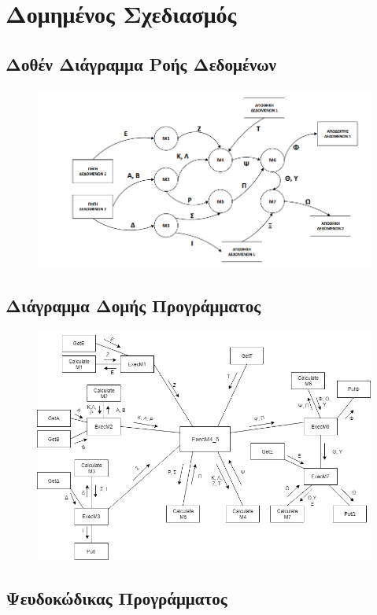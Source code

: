 \documentclass{article}
\begin{document}
\newpage
\section{Δομημένος Σχεδιασμός}
\subsection*{Δοθέν Διάγραμμα Ροής Δεδομένων}
\begin{figure}[!h]
	\includegraphics[width=\linewidth]{../Structured_Design/drd.png}
\end{figure}

\subsection{Διάγραμμα Δομής Προγράμματος}
\begin{figure}[!h]
	\includegraphics[width=14cm]{../Structured_Design/ddp.png}
\end{figure}

\newpage
\subsection{Ψευδοκώδικας Προγράμματος}
\end{document}

